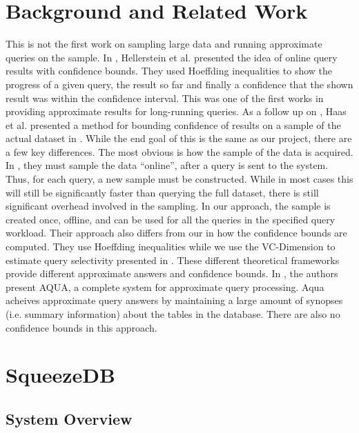 \documentclass[11pt]{article}
\begin{document}
\section{Background and Related Work}

This is not the first work on sampling large data and running
approximate queries on the sample. In \cite{Hellerstein}, Hellerstein
et al. presented the idea of online query results with confidence
bounds. They used Hoeffding inequalities to show the progress of a
given query, the result so far and finally a confidence that the shown
result was within the confidence interval. This was one of the first
works in providing approximate results for long-running queries. As a
follow up on \cite{Hellerstein}, Haas et al. presented a method for
bounding confidence of results on a sample of the actual dataset in
\cite{Haas}. While the end goal of this is the same as our project,
there are a few key differences. The most obvious is how the sample of
the data is acquired. In \cite{Haas}, they must sample the data
``online'', after a query is sent to the system. Thus, for each query,
a new sample must be constructed. While in most cases this will still
be significantly faster than querying the full dataset, there is still
significant overhead involved in the sampling. In our approach, the
sample is created once, offline, and can be used for all the queries
in the specified query workload. Their approach also differs from our
in how the confidence bounds are computed. They use Hoeffding
inequalities while we use the VC-Dimension to estimate query
selectivity presented in \cite{Matteo}. These different theoretical
frameworks provide different approximate answers and confidence
bounds. In \cite{Aqua}, the authors present AQUA, a complete system
for approximate query processing. Aqua acheives approximate query
answers by maintaining a large amount of synopses (i.e. summary
information) about the tables in the database. There are also no
confidence bounds in this approach.

\section{SqueezeDB}

\subsection{System Overview}
\end{document}
